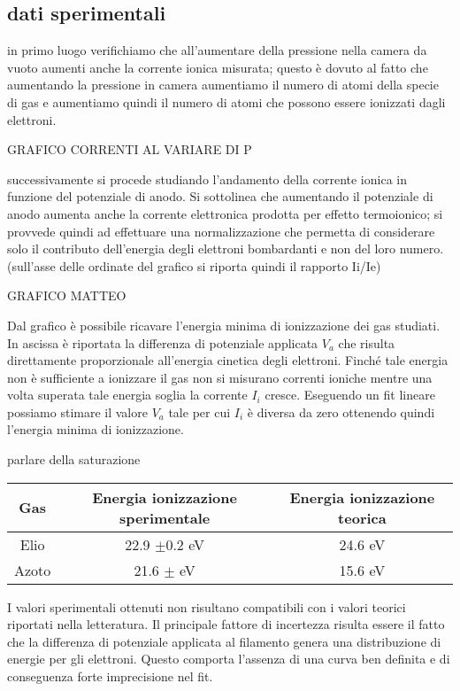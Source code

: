 \documentclass[11pt,a4paper]{article}
\begin{document}
\subsection{dati sperimentali}

in primo luogo verifichiamo che all'aumentare della pressione nella camera da vuoto aumenti anche la corrente ionica misurata; questo è dovuto al fatto che aumentando la pressione in camera aumentiamo il numero di atomi della specie di gas e aumentiamo quindi il numero di atomi che possono essere ionizzati dagli elettroni.

GRAFICO CORRENTI AL VARIARE DI P

successivamente si procede studiando l'andamento della corrente ionica in funzione del potenziale di anodo. Si sottolinea che aumentando il potenziale di anodo aumenta anche la corrente elettronica prodotta per effetto termoionico; si provvede quindi ad effettuare una normalizzazione che permetta di considerare solo il contributo dell'energia degli elettroni bombardanti e non del loro numero. (sull'asse delle ordinate del grafico si riporta quindi il rapporto Ii/Ie)

GRAFICO MATTEO

Dal grafico è possibile ricavare l'energia minima di ionizzazione dei gas studiati. In ascissa è riportata la differenza di potenziale applicata $V_{a}$ che risulta direttamente proporzionale all'energia cinetica degli elettroni. Finché tale energia non è sufficiente a ionizzare il gas non si misurano correnti ioniche mentre una volta superata tale energia soglia la corrente $I_{i}$ cresce. Eseguendo un fit lineare possiamo stimare il valore $V_{a}$ tale per cui $I_{i}$ è diversa da zero ottenendo quindi l'energia minima di ionizzazione.
 

parlare della saturazione

\begin{tabular}{|c|c|c|}
\hline 
Gas & Energia ionizzazione sperimentale & Energia ionizzazione teorica \\ 
\hline 
Elio & 22.9 $ \pm $0.2 eV & 24.6 eV \\ 
\hline 
Azoto & 21.6 $\pm$  eV & 15.6 eV \\ 
\hline 
\end{tabular} 


I valori sperimentali ottenuti non risultano compatibili con i valori teorici riportati nella letteratura. Il principale fattore di incertezza risulta essere il fatto che la differenza di potenziale applicata al filamento genera una distribuzione di energie per gli elettroni. Questo comporta l'assenza di una curva ben definita e di conseguenza forte imprecisione nel fit. 
\end{document}
